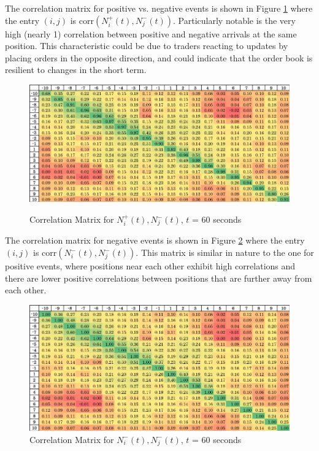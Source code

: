 The correlation matrix for positive vs. negative events is shown in Figure \ref{fig:pos_neg_corr_pic} where the entry $(i,j)$ is $\text{corr}(N^{+}_i(t), N^{-}_j(t))$. Particularly notable is the very high (nearly 1) correlation between positive and negative arrivals at the same position. This characteristic could be due to traders reacting to updates by placing orders in the opposite direction, and could indicate that the order book is resilient to changes in the short term.

\begin{figure}[t]
\caption{Correlation Matrix for $N^{+}_i(t), N^{-}_j(t)$, $t$ = 60 seconds}
\begin{center}
\label{fig:pos_neg_corr_pic}
\includegraphics[width=\textwidth]{LaTeX/Figures/pos_neg_correlations.png}
\end{center}
\end{figure}

The correlation matrix for negative events is shown in Figure \ref{fig:neg_neg_corr_pic} where the entry $(i,j)$ is $\text{corr}(N^{-}_i(t), N^{-}_j(t))$. This matrix is similar in nature to the one for positive events, where positions near each other exhibit high correlations and there are lower positive correlations between positions that are further away from each other.

\begin{figure}[t]
\begin{center}
\caption{Correlation Matrix for $N^{-}_i(t), N^{-}_j(t)$, $t$ = 60 seconds}
\label{fig:neg_neg_corr_pic}
\includegraphics[width=\textwidth]{LaTeX/Figures/neg_neg_correlations.png}
\end{center}
\end{figure}

